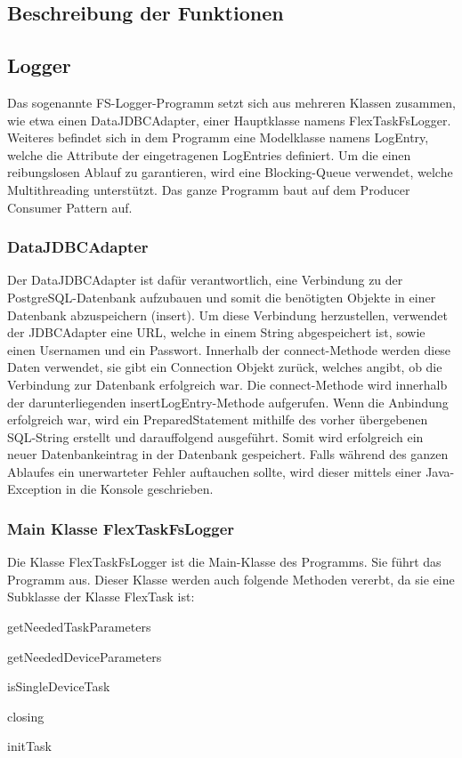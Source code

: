 \subsection{Beschreibung der Funktionen}

\subsection{Logger}
Das sogenannte FS-Logger-Programm setzt sich aus mehreren Klassen zusammen, wie etwa einen DataJDBCAdapter, einer Hauptklasse namens FlexTaskFsLogger. Weiteres befindet sich in dem Programm eine Modelklasse namens LogEntry, welche die Attribute der eingetragenen LogEntries definiert. Um die einen reibungslosen Ablauf zu garantieren, wird eine Blocking-Queue verwendet, welche Multithreading unterstützt. Das ganze Programm baut auf dem Producer Consumer Pattern auf.	

\subsubsection{DataJDBCAdapter}
Der DataJDBCAdapter ist dafür verantwortlich, eine Verbindung zu der PostgreSQL-Datenbank aufzubauen und somit die benötigten Objekte in einer Datenbank abzuspeichern (insert). Um diese Verbindung herzustellen, verwendet der JDBCAdapter eine URL, welche in einem String abgespeichert ist, sowie einen Usernamen und ein Passwort. Innerhalb der connect-Methode werden diese Daten verwendet, sie gibt ein Connection Objekt zurück, welches angibt, ob die Verbindung zur Datenbank erfolgreich war. Die connect-Methode wird innerhalb der darunterliegenden insertLogEntry-Methode aufgerufen. Wenn die Anbindung erfolgreich war, wird ein PreparedStatement mithilfe des vorher übergebenen SQL-String erstellt und darauffolgend ausgeführt. Somit wird erfolgreich ein neuer Datenbankeintrag in der Datenbank gespeichert. Falls während des ganzen Ablaufes ein unerwarteter Fehler auftauchen sollte, wird dieser mittels einer Java-Exception in die Konsole geschrieben.

\subsubsection{Main Klasse FlexTaskFsLogger}
Die Klasse FlexTaskFsLogger ist die Main-Klasse des Programms. Sie führt das Programm aus. Dieser Klasse werden auch folgende Methoden vererbt, da sie eine Subklasse der Klasse FlexTask ist: 
\begin{compactitem}
    \item getNeededTaskParameters
    \item getNeededDeviceParameters
    \item isSingleDeviceTask
    \item closing
    \item initTask
\end{compactitem}


